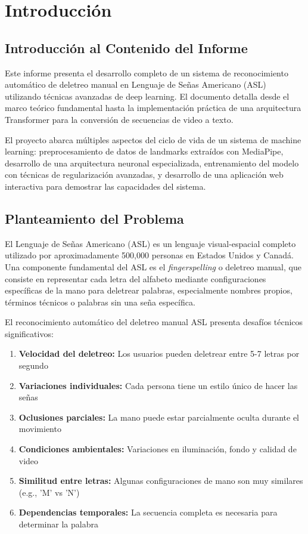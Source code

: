 \documentclass[12pt,a4paper]{article}
\begin{document}
\section{Introducción}

\subsection{Introducción al Contenido del Informe}

Este informe presenta el desarrollo completo de un sistema de reconocimiento automático de deletreo manual en Lenguaje de Señas Americano (ASL) utilizando técnicas avanzadas de deep learning. El documento detalla desde el marco teórico fundamental hasta la implementación práctica de una arquitectura Transformer para la conversión de secuencias de video a texto.

El proyecto abarca múltiples aspectos del ciclo de vida de un sistema de machine learning: preprocesamiento de datos de landmarks extraídos con MediaPipe, desarrollo de una arquitectura neuronal especializada, entrenamiento del modelo con técnicas de regularización avanzadas, y desarrollo de una aplicación web interactiva para demostrar las capacidades del sistema.

\subsection{Planteamiento del Problema}

El Lenguaje de Señas Americano (ASL) es un lenguaje visual-espacial completo utilizado por aproximadamente 500,000 personas en Estados Unidos y Canadá. Una componente fundamental del ASL es el \textit{fingerspelling} o deletreo manual, que consiste en representar cada letra del alfabeto mediante configuraciones específicas de la mano para deletrear palabras, especialmente nombres propios, términos técnicos o palabras sin una seña específica.

El reconocimiento automático del deletreo manual ASL presenta desafíos técnicos significativos:

\begin{enumerate}
    \item \textbf{Velocidad del deletreo:} Los usuarios pueden deletrear entre 5-7 letras por segundo
    \item \textbf{Variaciones individuales:} Cada persona tiene un estilo único de hacer las señas
    \item \textbf{Oclusiones parciales:} La mano puede estar parcialmente oculta durante el movimiento
    \item \textbf{Condiciones ambientales:} Variaciones en iluminación, fondo y calidad de video
    \item \textbf{Similitud entre letras:} Algunas configuraciones de mano son muy similares (e.g., 'M' vs 'N')
    \item \textbf{Dependencias temporales:} La secuencia completa es necesaria para determinar la palabra
\end{enumerate}
\end{document}
